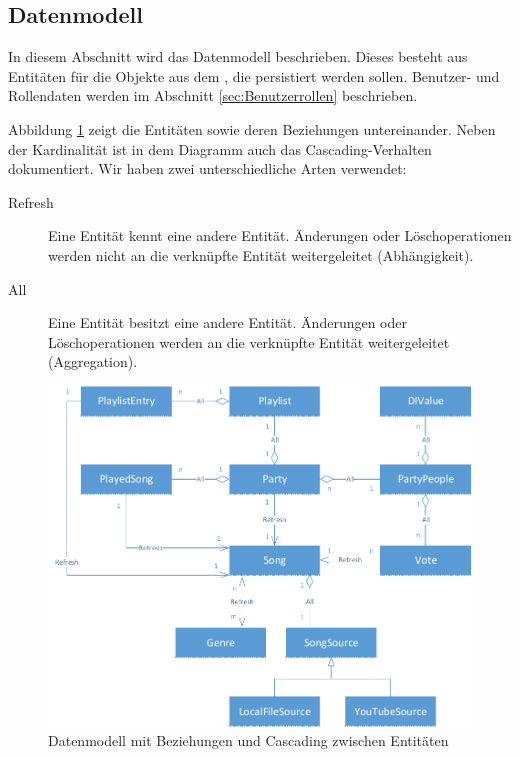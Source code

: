 \subsection{Datenmodell}

In diesem Abschnitt wird das Datenmodell beschrieben. Dieses besteht aus Entitäten für die Objekte aus dem , die persistiert werden sollen. Benutzer- und Rollendaten werden im Abschnitt \ref{sec:Benutzerrollen} beschrieben.

Abbildung \ref{fig:Datenmodell} zeigt die Entitäten sowie deren Beziehungen untereinander. Neben der Kardinalität ist in dem Diagramm auch das Cascading-Verhalten dokumentiert. Wir haben zwei unterschiedliche Arten verwendet:
\begin{description}
	\item[Refresh] Eine Entität kennt eine andere Entität. Änderungen oder Löschoperationen werden nicht an die verknüpfte Entität weitergeleitet (Abhängigkeit).
	\item[All] Eine Entität besitzt eine andere Entität. 
	Änderungen oder Löschoperationen werden an die 
	verknüpfte Entität weitergeleitet (Aggregation).
\end{description}

\vspace{8pt}
\begin{figure}[htb]
\centering
\includegraphics[width=1\linewidth]{Bilder/Datenmodell}
\caption{Datenmodell mit Beziehungen und Cascading zwischen Entitäten}
\label{fig:Datenmodell}
\end{figure}

